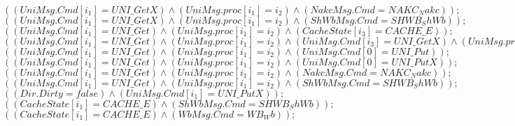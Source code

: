 \documentclass{llncs}
\begin{document}
\begin{itemize}
$( ( UniMsg.Cmd[i_1]=UNI\_GetX)  \wedge ( UniMsg.proc[i_1]=i_2)  \wedge ( NakcMsg.Cmd=NAKC_Nakc)  ) ;$
$( ( UniMsg.Cmd[i_1]=UNI\_GetX)  \wedge ( UniMsg.proc[i_1]=i_2)  \wedge ( ShWbMsg.Cmd=SHWB_ShWb)  ) ;$
$( ( UniMsg.Cmd[i_1]=UNI\_Get)  \wedge ( UniMsg.proc[i_1]=i_2)  \wedge ( CacheState[i_3]=CACHE\_E)  ) ;$
$( ( UniMsg.Cmd[i_1]=UNI\_Get)  \wedge ( UniMsg.proc[i_1]=i_2)  \wedge ( UniMsg.Cmd[i_3]=UNI\_GetX)  \wedge ( UniMsg.proc[i_3]=i_2)  ) ;$
$( ( UniMsg.Cmd[i_1]=UNI\_Get)  \wedge ( UniMsg.proc[i_1]=i_2)  \wedge ( UniMsg.Cmd[0]=UNI\_Put)  ) ;$
$( ( UniMsg.Cmd[i_1]=UNI\_Get)  \wedge ( UniMsg.proc[i_1]=i_2)  \wedge ( UniMsg.Cmd[0]=UNI\_PutX)  ) ;$
$( ( UniMsg.Cmd[i_1]=UNI\_Get)  \wedge ( UniMsg.proc[i_1]=i_2)  \wedge ( NakcMsg.Cmd=NAKC_Nakc)  ) ;$
$( ( UniMsg.Cmd[i_1]=UNI\_Get)  \wedge ( UniMsg.proc[i_1]=i_2)  \wedge ( ShWbMsg.Cmd=SHWB_ShWb)  ) ;$
$( ( Dir.Dirty=false)  \wedge ( UniMsg.Cmd[i_1]=UNI\_PutX)  ) ;$
$( ( CacheState[i_1]=CACHE\_E)  \wedge ( ShWbMsg.Cmd=SHWB_ShWb)  ) ;$
$( ( CacheState[i_1]=CACHE\_E)  \wedge ( WbMsg.Cmd=WB_Wb)  ) ;$


\end{itemize}
\end{document}
